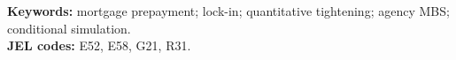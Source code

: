 \documentclass[12pt]{article}
\begin{document}
\vspace{0.5\baselineskip}
{\footnotesize\noindent\textbf{Keywords:} mortgage prepayment; lock-in; quantitative tightening; agency MBS; conditional simulation.\\
\textbf{JEL codes:} E52, E58, G21, R31.\par}
\newpage
\doublespacing

\clearpage
\singlespacing


\clearpage
\appendix

\end{document}

